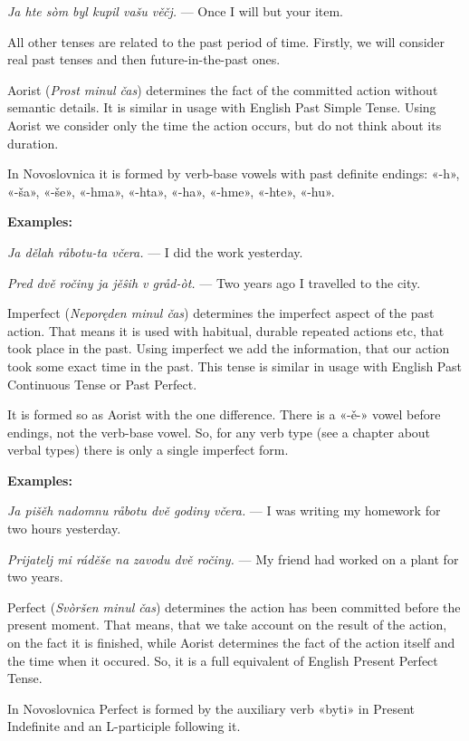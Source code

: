 \textit{Ja hte sòm byl kupil vašu věčj.} — Once I will but your item.

All other tenses are related to the past period of time. Firstly, we will consider real past tenses and then future-in-the-past ones.

Aorist (\textit{Prost minul čas}) determines the fact of the committed action without semantic details. It is similar in usage with English Past Simple Tense. Using Aorist we consider only the time the action occurs, but do not think about its duration.

In Novoslovnica it is formed by verb-base vowels with past definite endings: «-h», «-ša», «-še», «-hma», «-hta», «-ha», «-hme», «-hte», «-hu».

\textbf{Examples:}

\textit{Ja dělah råbotu-ta včera.} — I did the work yesterday.

\textit{Pred dvě ročiny ja jěŝih v gråd-òt.} — Two years ago I travelled to the city.

Imperfect (\textit{Neporęden minul čas}) determines the imperfect aspect of the past action. That means it is used with habitual, durable repeated actions etc, that took place in the past. Using imperfect we add the information, that our action took some exact time in the past. This tense is similar in usage with English Past Continuous Tense or Past Perfect.

It is formed so as Aorist with the one difference. There is a «-ě-» vowel before endings, not the verb-base vowel. So, for any verb type (see a chapter about verbal types) there is only a single imperfect form.

\textbf{Examples:}

\textit{Ja pišěh nadomnu råbotu dvě godiny včera.} — I was writing my homework for two hours yesterday.

\textit{Prijatelj mi ráděše na zavodu dvě ročiny.} — My friend had worked on a plant for two years.

Perfect (\textit{Svòršen minul čas}) determines the action has been committed before the present moment. That means, that we take account on the result of the action, on the fact it is finished, while Aorist determines the fact of the action itself and the time when it occured. So, it is a full equivalent of English Present Perfect Tense.

In Novoslovnica Perfect is formed by the auxiliary verb «byti» in Present Indefinite and an L-participle following it.

